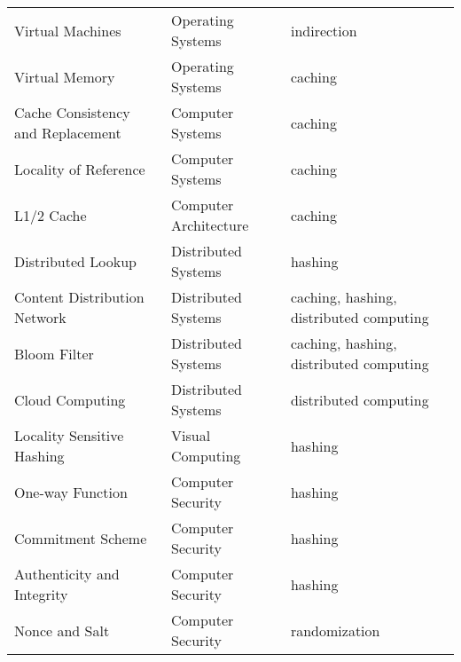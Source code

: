 \documentclass[landscape,a4paper,9pt]{exam}
\begin{document}
\begin{tabular}{|lll|}
Virtual Machines & Operating Systems & indirection \\
Virtual Memory & Operating Systems & caching \\
\hline
Cache Consistency and Replacement & Computer Systems & caching \\
Locality of Reference & Computer Systems & caching \\
\hline
L1/2 Cache & Computer Architecture & caching \\
\hline
Distributed Lookup & Distributed Systems & hashing \\
Content Distribution Network & Distributed Systems & caching, hashing, distributed computing \\
Bloom Filter & Distributed Systems & caching, hashing, distributed computing \\
Cloud Computing & Distributed Systems & distributed computing \\
\hline
Locality Sensitive Hashing & Visual Computing & hashing \\
\hline
One-way Function & Computer Security & hashing \\
Commitment Scheme & Computer Security & hashing \\
Authenticity and Integrity & Computer Security & hashing \\
Nonce and Salt & Computer Security & randomization \\
\hline
\end{tabular}
\end{document}
